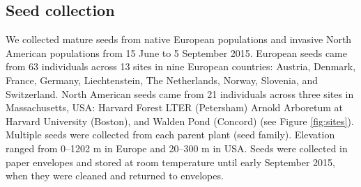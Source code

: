 \documentclass[11pt]{article}\usepackage[]{graphicx}\usepackage[]{color}
\begin{document}
	\subsection{Seed collection} 
	We collected mature seeds from native European populations and invasive North American populations from 15 June to 5 September 2015. European seeds came from 63 individuals across 13 sites in nine European countries: Austria, Denmark, France, Germany, Liechtenstein, The Netherlands, Norway, Slovenia, and Switzerland.  North American seeds came from 21 individuals across three sites  in Massachusetts, USA: Harvard Forest LTER (Petersham) Arnold Arboretum at Harvard University (Boston), and Walden Pond (Concord) (see Figure \ref{fig:sites}). Multiple seeds were collected from each parent plant (seed family). Elevation ranged from 0--1202 m in Europe and 20--300 m in USA. Seeds were collected in paper envelopes and stored at room temperature until early September 2015, when they were cleaned and returned to envelopes.  %
	
	
\end{document}
